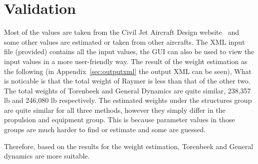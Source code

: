 \section{Validation}
\label{sec:validation}
Most of the values are taken from the Civil Jet Aircraft Design website~\cite{data} and some other values are estimated or taken from other aircrafts.
The XML input file (provided) contains all the input values, the GUI can also be used to view the input values in a more user-friendly way.
The result of the weight estimation as the following (in Appendix~\ref{sec:outputxml} the output XML can be seen),
What is noticable is that the total weight of Raymer is less than that of the other two.
The total weights of Torenbeek and General Dynamics are quite similar, 238,357 lb and 246,080 lb respectively.
The estimated weights under the structures group are quite similar for all three methods, however they simply differ in the propulsion and equipment group.
This is because parameter values in those groups are much harder to find or estimate and some are guessed.

Therefore, based on the results for the weight estimation, Torenbeek and General dynamics are more suitable.
